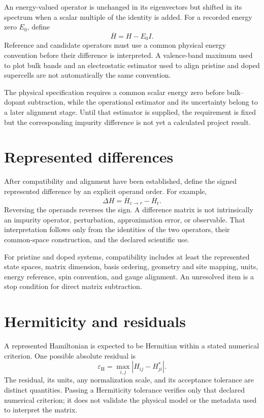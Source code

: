 An energy-valued operator is unchanged in its eigenvectors but shifted in its
spectrum when a scalar multiple of the identity is added. For a recorded energy
zero $E_0$, define
\begin{equation}
  \overline H=H-E_0I.
\end{equation}
Reference and candidate operators must use a common physical energy convention
before their difference is interpreted. A valence-band maximum used to plot
bulk bands and an electrostatic estimator used to align pristine and doped
supercells are not automatically the same convention.

The physical specification requires a common scalar energy zero before
bulk--dopant subtraction, while the operational estimator and its uncertainty
belong to a later alignment stage. Until that estimator is supplied, the
requirement is fixed but the corresponding impurity difference is not yet a
calculated project result.

\section{Represented differences}

After compatibility and alignment have been established, define the signed
represented difference by an explicit operand order. For example,
\begin{equation}
  \Delta H
  =
  \overline H_{\mathrm c\rightarrow r}
  -
  \overline H_{\mathrm r}.
\end{equation}
Reversing the operands reverses the sign. A difference matrix is not
intrinsically an impurity operator, perturbation, approximation error, or
observable. That interpretation follows only from the identities of the two
operators, their common-space construction, and the declared scientific use.

For pristine and doped systems, compatibility includes at least the represented
state spaces, matrix dimension, basis ordering, geometry and site mapping,
units, energy reference, spin convention, and gauge alignment. An unresolved
item is a stop condition for direct matrix subtraction.

\section{Hermiticity and residuals}

A represented Hamiltonian is expected to be Hermitian within a stated numerical
criterion. One possible absolute residual is
\begin{equation}
  \varepsilon_{\mathrm H}
  =
  \max_{i,j}\left|H_{ij}-H_{ji}^{*}\right|.
\end{equation}
The residual, its units, any normalization scale, and its acceptance tolerance
are distinct quantities. Passing a Hermiticity tolerance verifies only that
declared numerical criterion; it does not validate the physical model or the
metadata used to interpret the matrix.

